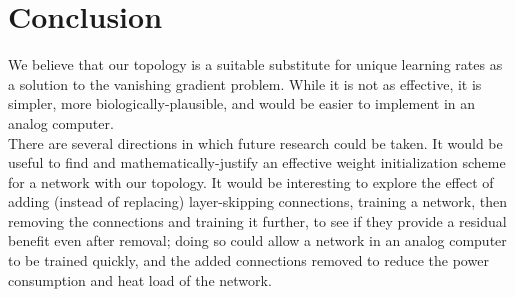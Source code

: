 \documentclass{article}
\newcommand{\npar}{\\\indent}
\begin{document}
\section{Conclusion}

We believe that our topology is a suitable substitute for unique learning rates as a solution to the vanishing gradient problem. While it is not as effective, it is simpler, more biologically-plausible, and would be easier to implement in an analog computer.
\npar
There are several directions in which future research could be taken. It would be useful to find and mathematically-justify an effective weight initialization scheme for a network with our topology. It would be interesting to explore the effect of adding (instead of replacing) layer-skipping connections, training a network, then removing the connections and training it further, to see if they provide a residual benefit even after removal; doing so could allow a network in an analog computer to be trained quickly, and the added connections removed to reduce the power consumption and heat load of the network. 



\nocite{*}

\end{document}
